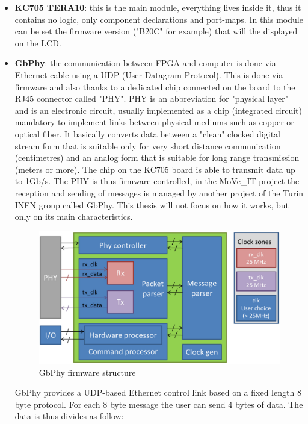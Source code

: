 \begin{itemize}
	\item \textbf{KC705 TERA10}: this is the main module, everything lives inside it, thus it contains no logic, only component declarations and port-maps. In this module can be set the firmware version ("B20C" for example) that will the displayed on the LCD.
	\item \textbf{GbPhy}: the communication between FPGA and computer is done via Ethernet cable using a UDP (User Datagram Protocol). This is done via firmware and also thanks to a dedicated chip connected on the board to the RJ45 connector called "PHY".
	\newline
	PHY is an abbreviation for "physical layer" and is an electronic circuit, usually implemented as a chip (integrated circuit) mandatory to implement links between physical mediums such as copper or optical fiber. It basically converts data between a "clean" clocked digital stream form that is suitable only for very short distance communication (centimetres) and an analog form that is suitable for long range transmission (meters or more).
	The chip on the KC705 board is able to transmit data up to 1Gb/s.
	\newline
	The PHY is thus firmware controlled, in the MoVe\_IT project the reception and sending of messages is managed by another project of the Turin INFN group called GbPhy. This thesis will  not focus on how it works, but only on its main characteristics\cite{gbphy}.     
	\begin{figure}[H]
		\centering
		\includegraphics[width=0.7\linewidth]{IMG/ch4/PHY100}
		\caption{GbPhy firmware structure}
		\label{fig:phy100}
	\end{figure}
	\noindent GbPhy provides a UDP-based Ethernet control link based on a fixed length 8 byte protocol.
	For each 8 byte message the user can send 4 bytes of data. The data is thus divides as follow:
	\begin{itemize}

\end{itemize}
\end{itemize}
